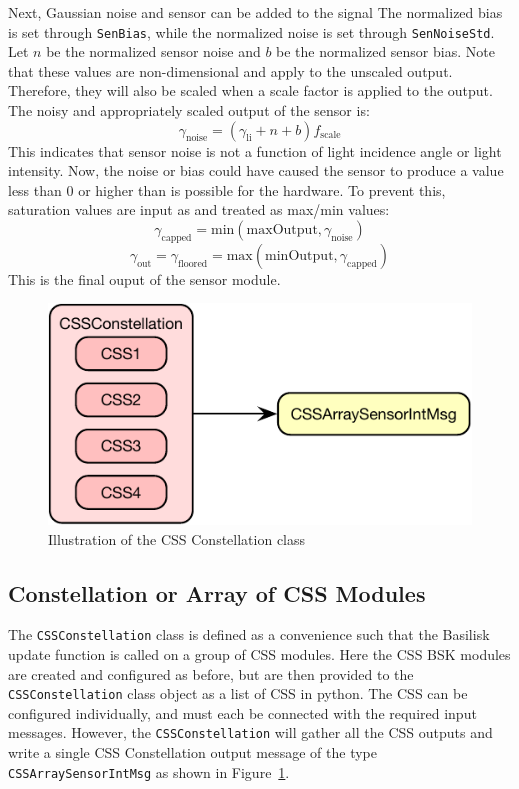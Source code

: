 Next, Gaussian noise and sensor can be added to the signal The normalized bias is set through {\tt SenBias}, while the normalized noise is set through {\tt SenNoiseStd}.   Let $ n$ be the normalized sensor noise and $b$ be the normalized sensor bias.  Note that these values are non-dimensional and apply to the unscaled output.  Therefore, they will also be scaled when a scale factor is applied to the output. The noisy and appropriately scaled output of the sensor is:
\begin{equation}
	\gamma_{\mathrm{noise}} = (\gamma_{\textrm{li}} + n + b) f_{\mathrm{scale}} 
\end{equation}
This indicates that sensor noise is not a function of light incidence angle or light intensity.
Now, the noise or bias could have caused the sensor to produce a value less than 0 or higher than is possible for the hardware. To prevent this, saturation values are input as and treated as max/min values:
\begin{equation}
	\gamma_{\mathrm{capped}} = \mathrm{min}(\mathrm{maxOutput}, \gamma_{\mathrm{noise}})
\end{equation}
\begin{equation}
	\gamma_{\mathrm{out}} = \gamma_{\mathrm{floored}} = \mathrm{max}(\mathrm{minOutput}, \gamma_{\mathrm{capped}})
\end{equation}
This is the final ouput of the sensor module.




\begin{figure}[htb]
	\centerline{
	\includegraphics[]{Figures/moduleDiagramConstellation}
	}
	\caption{Illustration of the CSS Constellation class}
	\label{fig:moduleDiagramConstellation}
\end{figure}
\subsection{Constellation or Array of CSS Modules}
The {\tt CSSConstellation} class is defined as a convenience such that the Basilisk update function is called on a group of CSS modules.  Here the CSS BSK modules are created and configured as before, but are then provided to the {\tt CSSConstellation} class object as a list of CSS in python.  The CSS can be configured individually, and must each be connected with the required input messages.  However, the {\tt CSSConstellation} will gather all the CSS outputs and write a single CSS Constellation output message of the type {\tt CSSArraySensorIntMsg} as shown in Figure~\ref{fig:moduleDiagramConstellation}.  



